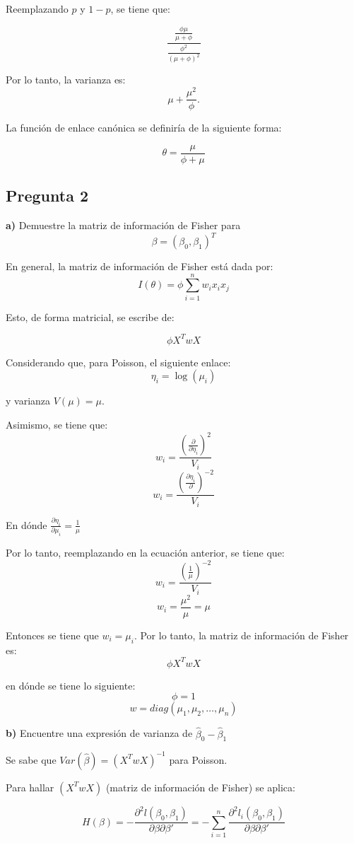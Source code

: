 \documentclass[]{article}
\begin{document}
Reemplazando \(p\) y \(1-p\), se tiene que:

\[\frac{\frac{\phi \mu}{\mu+\phi}}{\frac{\phi^2}{(\mu+\phi)^2}}\]

Por lo tanto, la varianza es: \[\mu + \frac{\mu^2}{\phi}.\]

La función de enlace canónica se definiría de la siguiente forma:

\[\theta=\frac{\mu}{\phi+\mu}\]

\hypertarget{pregunta-2}{%
\subsection{Pregunta 2}\label{pregunta-2}}

\textbf{a)} Demuestre la matriz de información de Fisher para
\[\beta= (\beta_0,\beta_1)^T \]

En general, la matriz de información de Fisher está dada por:
\[I(\theta)= \phi\sum^n_{i=1}w_i x_i x_j\]

Esto, de forma matricial, se escribe de:

\[\phi X^TwX\]

Considerando que, para Poisson, el siguiente enlace:
\[\eta_i=\log(\mu_i)\]

y varianza \(V(\mu)=\mu\).

Asimismo, se tiene que:
\[w_i=\frac{(\frac{\partial}{\partial\eta_i})^2}{V_i}\]
\[w_i=\frac{(\frac{\partial\eta_i}{\partial})^{-2}}{V_i}\]

En dónde \(\frac{\partial \eta_i}{\partial \mu_i}=\frac{1}{\mu}\)

Por lo tanto, reemplazando en la ecuación anterior, se tiene que:
\[w_i=\frac{(\frac{1}{\mu})^{-2}}{V_i}\] \[w_i=\frac{\mu^2}{\mu}=\mu\]

Entonces se tiene que \(w_i=\mu_i\). Por lo tanto, la matriz de
información de Fisher es: \[\phi X^TwX\]

en dónde se tiene lo siguiente: \[\phi=1\]
\[w=diag(\mu_1,\mu_2,\ldots,\mu_n)\]

\textbf{b)} Encuentre una expresión de varianza de
\(\hat\beta_0 - \hat\beta_1\)

Se sabe que \(Var(\hat\beta)=(X^TwX)^{-1}\) para Poisson.

Para hallar \((X^TwX)\) (matriz de información de Fisher) se aplica:

\[H(\beta) =-\frac{\partial^2 l(\beta_0,\beta_1)}{\partial \beta  \partial\beta'}  = - \sum^n_{i=1}  \frac{\partial^2 l_i(\beta_0,\beta_1)}{\partial \beta  \partial\beta'}\]
\end{document}
